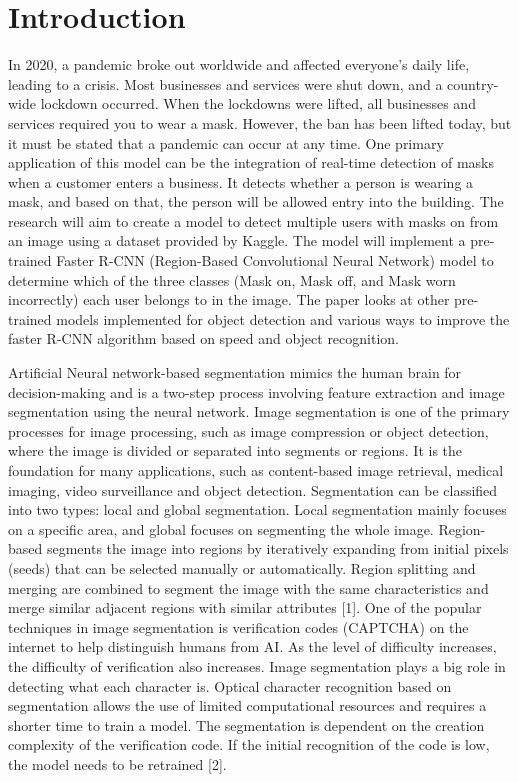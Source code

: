 \documentclass[conference]{IEEEtran}
\begin{document}
\section{Introduction}
    In 2020, a pandemic broke out worldwide and affected everyone's daily life, leading to a crisis. Most businesses and services were shut down, 
    and a country-wide lockdown occurred. When the lockdowns were lifted, all businesses and services required you to wear a mask. However, the 
    ban has been lifted today, but it must be stated that a pandemic can occur at any time.  One primary application of this model can be the 
    integration of real-time detection of masks when a customer enters a business. It detects whether a person is wearing a mask, and based on that, 
    the person will be allowed entry into the building. The research will aim to create a model to detect multiple users with masks on from an image 
    using a dataset provided by Kaggle. The model will implement a pre-trained Faster R-CNN (Region-Based Convolutional Neural Network) model to 
    determine which of the three classes (Mask on, Mask off, and Mask worn incorrectly) each user belongs to in the image. The paper looks at other 
    pre-trained models implemented for object detection and various ways to improve the faster R-CNN algorithm based on speed and object recognition. 

    Artificial Neural network-based segmentation mimics the human brain for decision-making and is a two-step process involving feature extraction and 
    image segmentation using the neural network. Image segmentation is one of the primary processes for image processing, such as image compression or 
    object detection, where the image is divided or separated into segments or regions. It is the foundation for many applications, such as content-based 
    image retrieval, medical imaging, video surveillance and object detection. Segmentation can be classified into two types: local and global segmentation. 
    Local segmentation mainly focuses on a specific area, and global focuses on segmenting the whole image. Region-based segments the image into regions by 
    iteratively expanding from initial pixels (seeds) that can be selected manually or automatically.  Region splitting and merging are combined to segment 
    the image with the same characteristics and merge similar adjacent regions with similar attributes [1]. One of the popular techniques in image segmentation 
    is verification codes (CAPTCHA) on the internet to help distinguish humans from AI. As the level of difficulty increases, the difficulty of verification 
    also increases. Image segmentation plays a big role in detecting what each character is. Optical character recognition based on segmentation allows the 
    use of limited computational resources and requires a shorter time to train a model. The segmentation is dependent on the creation complexity of the 
    verification code. If the initial recognition of the code is low, the model needs to be retrained [2].
     
\end{document}
